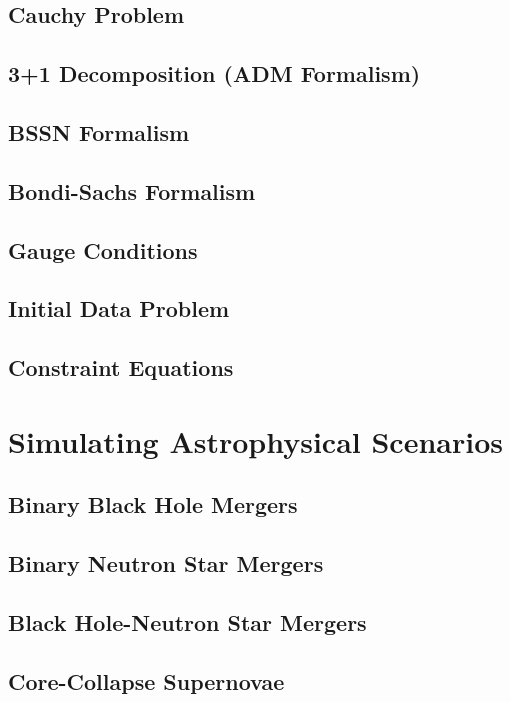 \section{Cauchy Problem}\label{sec:cauchy-problem}
\section{3+1 Decomposition (ADM Formalism)}\label{sec:3+1-decomposition-adm-formalism}
\section{BSSN Formalism}\label{sec:bssn-formalism}
\section{Bondi-Sachs Formalism}\label{sec:bondi-sachs-formalism}
\section{Gauge Conditions}\label{sec:nr-gauge-conditions}
\section{Initial Data Problem}\label{sec:initial-data-problem}
\section{Constraint Equations}\label{sec:constraint-equations}

\chapter{Simulating Astrophysical Scenarios}\label{ch:simulating-astrophysical-scenarios}
\section{Binary Black Hole Mergers}\label{sec:binary-black-hole-mergers-nr}
\section{Binary Neutron Star Mergers}\label{sec:binary-neutron-star-mergers-nr}
\section{Black Hole-Neutron Star Mergers}\label{sec:black-hole-neutron-star-mergers-nr}
\section{Core-Collapse Supernovae}\label{sec:core-collapse-supernovae}
